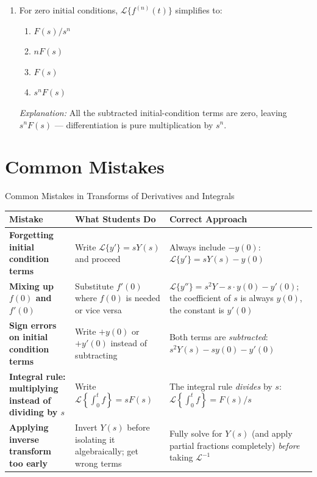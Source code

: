 \documentclass[12pt,a4paper]{article}
\begin{document}
\begin{enumerate}[label=\textbf{MCQ \arabic*.}]
\item For zero initial conditions, \(\mathcal{L}\{f^{(n)}(t)\}\) simplifies to:
\begin{enumerate}[label=(\alph*)]
  \item \(F(s)/s^n\)
  \item \(nF(s)\)
  \item \(F(s)\)
  \item \textbf{\(s^n F(s)\)}
\end{enumerate}
\textit{Explanation:} All the subtracted initial-condition terms are zero, leaving
\(s^n F(s)\) --- differentiation is pure multiplication by \(s^n\).

\end{enumerate}

\section{Common Mistakes}

\begin{mistakebox}{Common Mistakes in Transforms of Derivatives and Integrals}
\begin{tabular}{>{\bfseries}p{3.8cm} p{4.8cm} p{5cm}}
\toprule
Mistake & What Students Do & Correct Approach \\
\midrule
Forgetting initial condition terms
  & Write \(\mathcal{L}\{y'\}=sY(s)\) and proceed
  & Always include \(-y(0)\): \(\mathcal{L}\{y'\}=sY(s)-y(0)\) \\[6pt]
Mixing up \(f(0)\) and \(f'(0)\)
  & Substitute \(f'(0)\) where \(f(0)\) is needed or vice versa
  & \(\mathcal{L}\{y''\}=s^2Y-s\cdot y(0)-y'(0)\); the coefficient of \(s\) is always \(y(0)\), the constant is \(y'(0)\) \\[6pt]
Sign errors on initial condition terms
  & Write \(+y(0)\) or \(+y'(0)\) instead of subtracting
  & Both terms are \emph{subtracted}: \(s^2Y(s) - sy(0) - y'(0)\) \\[6pt]
Integral rule: multiplying instead of dividing by \(s\)
  & Write \(\mathcal{L}\!\left\{\int_0^t f\right\} = sF(s)\)
  & The integral rule \emph{divides} by \(s\): \(\mathcal{L}\!\left\{\int_0^t f\right\} = F(s)/s\) \\[6pt]
Applying inverse transform too early
  & Invert \(Y(s)\) before isolating it algebraically; get wrong terms
  & Fully solve for \(Y(s)\) (and apply partial fractions completely) \emph{before} taking \(\mathcal{L}^{-1}\) \\
\bottomrule
\end{tabular}
\end{mistakebox}
\end{document}
